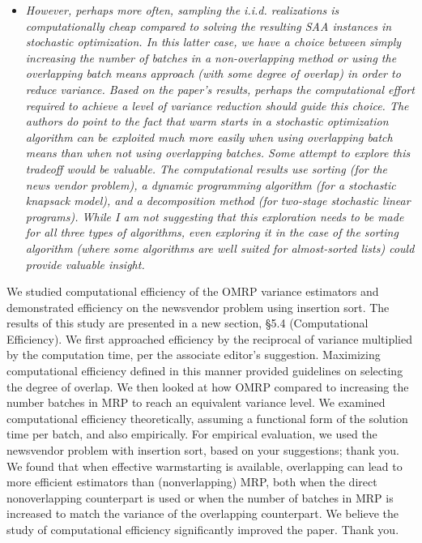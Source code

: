 \documentclass[11pt,notitlepage,onecolumn]{article}
\newcommand{\noi}{\noindent}
\begin{document}
\begin{itemize}
\item[] \textit{However, perhaps more often, sampling the i.i.d. realizations is computationally cheap compared to solving the resulting SAA instances in stochastic optimization. 
In this latter case, we have a choice between simply increasing the number of batches in a non-overlapping method or using the overlapping batch means approach (with some degree of overlap) in order to reduce variance.
Based on the paper's results, perhaps the computational effort required to achieve a level of variance reduction should guide this choice. 
The authors do point to the fact that warm starts in a stochastic
optimization algorithm can be exploited much more easily when using overlapping batch means than when not using overlapping batches. 
Some attempt to explore this tradeoff would be valuable. 
The computational results use sorting (for the news vendor problem), a dynamic programming algorithm (for a stochastic knapsack model), and a decomposition method (for two-stage stochastic linear programs). 
While I am not suggesting that this exploration needs to be made for all three types of algorithms, even exploring it in the case of the sorting algorithm (where some algorithms are well suited for almost-sorted lists) could provide valuable insight.}
\end{itemize}

\noi 
We studied computational efficiency of the OMRP variance estimators and demonstrated efficiency on the newsvendor problem using insertion sort. 
The results of this study are presented in a new section, \S 5.4 (Computational Efficiency).
We first approached efficiency by the reciprocal of variance multiplied by the computation time, per the associate editor's suggestion. 
Maximizing computational efficiency defined in this manner provided guidelines on selecting the degree of overlap. 
We then looked at how OMRP compared to increasing the number batches in MRP to reach an equivalent variance level.
We examined computational efficiency theoretically, assuming a functional form of the solution time per batch, and also empirically. 
For empirical evaluation, we used the newsvendor problem with insertion sort, based on your suggestions; thank you. 
We found that when effective warmstarting is available, overlapping can lead to more efficient estimators than (nonverlapping) MRP, both when the direct nonoverlapping counterpart is used or when the number of batches in MRP is increased to match the variance of the overlapping counterpart.  
We believe the study of computational efficiency significantly improved the paper. 
Thank you.\smallskip 
\end{document}
